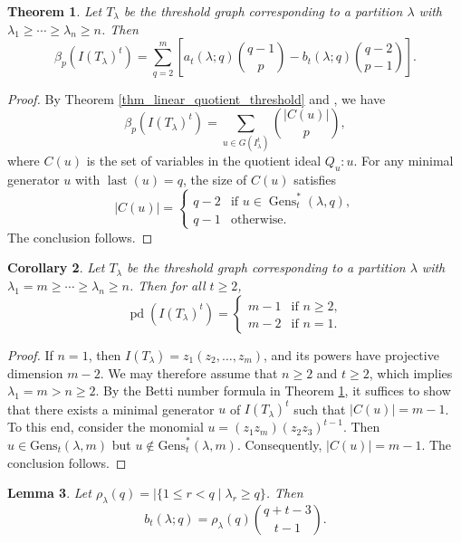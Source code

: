 \documentclass[12pt,amscd]{amsart}
\newtheorem{thm}{Theorem}[section]
\newtheorem{cor}[thm]{Corollary}
\newtheorem{lem}[thm]{Lemma}
\theoremstyle{definition}
\numberwithin{equation}{section}
\DeclareMathOperator{\pd}{pd}
\begin{document}
\begin{thm}\label{thm_Betti_threshold} 
Let $T_\lambda$ be the threshold graph corresponding to a partition $\lambda$ with $\lambda_1 \ge \cdots \ge \lambda_n \ge n$. Then 
\[
\beta_p(I(T_\lambda)^t) = \sum_{q=2}^m \left[ a_t(\lambda; q) \binom{q-1}{p} - b_t(\lambda; q) \binom{q-2}{p-1} \right].
\]
\end{thm}

\begin{proof}
By Theorem \ref{thm_linear_quotient_threshold} and \cite[Theorem 2.6]{SV}, we have 
\[
\beta_p(I(T_\lambda)^t) = \sum_{u \in G(I_\lambda^t)} \binom{|C(u)|}{p},
\]
where $C(u)$ is the set of variables in the quotient ideal $Q_u : u$. For any minimal generator $u$ with $\operatorname{last}(u) = q$, the size of $C(u)$ satisfies
\[
|C(u)| = 
\begin{cases} 
q - 2 & \text{if } u \in \operatorname{Gens}_t^*(\lambda, q), \\ 
q - 1 & \text{otherwise}. 
\end{cases}
\]
The conclusion follows.
\end{proof}

\begin{cor}\label{cor_pd_threshold} 
Let $T_\lambda$ be the threshold graph corresponding to a partition $\lambda$ with $\lambda_1 = m \ge \cdots \ge \lambda_n \ge n$. Then for all $t \ge 2$,
\[
\pd(I(T_\lambda)^t) = 
\begin{cases} 
m - 1 & \text{if } n \ge 2, \\ 
m - 2 & \text{if } n = 1. 
\end{cases}
\]
\end{cor}

\begin{proof}
If $n = 1$, then $I(T_\lambda) = z_1(z_2,\ldots,z_m)$, and its powers have projective dimension $m - 2$. We may therefore assume that $n \ge 2$ and $t \ge 2$, which implies $\lambda_1 = m > n \ge 2$. By the Betti number formula in Theorem \ref{thm_Betti_threshold}, it suffices to show that there exists a minimal generator $u$ of $I(T_\lambda)^t$ such that $|C(u)| = m - 1$. To this end, consider the monomial $u = (z_1 z_m)(z_2 z_3)^{t-1}$. Then $u \in \text{Gens}_t(\lambda, m)$ but $u \notin \text{Gens}_t^*(\lambda, m)$. Consequently, $|C(u)| = m - 1$. The conclusion follows.
\end{proof}

\begin{lem}\label{lem_b_t} 
Let $\rho_\lambda(q) = |\{ 1 \le r < q \mid \lambda_r \ge q \}$. Then 
\[
b_t(\lambda; q) = \rho_\lambda(q) \binom{q + t - 3}{t - 1}.
\]
\end{lem}
\end{document}
